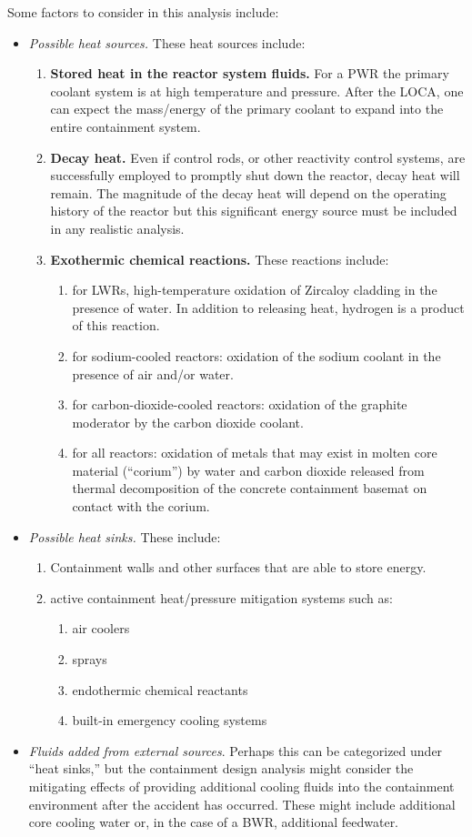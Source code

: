 Some factors to consider in this analysis include:
\begin{itemize}
\item \emph{Possible heat sources.} These heat sources include:
\begin{enumerate}
\item \textbf{Stored heat in the reactor system fluids.}  For a PWR the primary coolant system is at high temperature and pressure.  After the LOCA, one can expect the mass/energy of the primary coolant to expand into the entire containment system.  
\item \textbf{Decay heat.}  Even if control rods, or other reactivity control systems, are successfully employed to promptly shut down the reactor, decay heat will remain.  The magnitude of the decay heat will depend on the operating history of the reactor but this significant energy source must be included in any realistic analysis.
\item \textbf{Exothermic chemical reactions.}  These reactions include:
\begin{enumerate}
\item for LWRs, high-temperature oxidation of Zircaloy cladding in the presence of water.  In addition to releasing heat, hydrogen is a product of this reaction.
\item for sodium-cooled reactors: oxidation of the sodium coolant in the presence of air and/or water.
\item for carbon-dioxide-cooled reactors: oxidation of the graphite moderator by the carbon dioxide coolant.
\item for all reactors: oxidation of metals that may exist in molten core material (``corium'') by water and carbon dioxide released from thermal decomposition of the concrete containment basemat on contact with the corium.
\end{enumerate}
\end{enumerate}
\item \emph{Possible heat sinks.} These include:
\begin{enumerate}
\item Containment walls and other surfaces that are able to store energy.
\item active containment heat/pressure mitigation systems such as:
\begin{enumerate}
\item air coolers
\item sprays
\item endothermic chemical reactants
\item built-in emergency cooling systems
\end{enumerate}
\end{enumerate}
\item \emph{Fluids added from external sources}.  Perhaps this can be categorized under ``heat sinks,'' but the containment design analysis might consider the mitigating effects of providing additional cooling fluids into the containment environment after the accident has occurred.  These might include additional core cooling water or, in the case of a BWR, additional feedwater.
\end{itemize}

